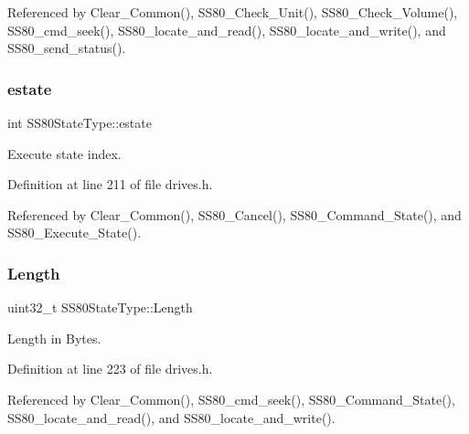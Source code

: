Referenced by Clear\+\_\+\+Common(), S\+S80\+\_\+\+Check\+\_\+\+Unit(), S\+S80\+\_\+\+Check\+\_\+\+Volume(), S\+S80\+\_\+cmd\+\_\+seek(), S\+S80\+\_\+locate\+\_\+and\+\_\+read(), S\+S80\+\_\+locate\+\_\+and\+\_\+write(), and S\+S80\+\_\+send\+\_\+status().

\mbox{\label{structSS80StateType_ae4a94143cb4201687be4e33684be057e}} 
\subsubsection{\texorpdfstring{estate}{estate}}
{\footnotesize\ttfamily int S\+S80\+State\+Type\+::estate}



Execute state index. 



Definition at line 211 of file drives.\+h.



Referenced by Clear\+\_\+\+Common(), S\+S80\+\_\+\+Cancel(), S\+S80\+\_\+\+Command\+\_\+\+State(), and S\+S80\+\_\+\+Execute\+\_\+\+State().

\mbox{\label{structSS80StateType_a507159f0a0a4f3127488081fd618e8f6}} 
\subsubsection{\texorpdfstring{Length}{Length}}
{\footnotesize\ttfamily uint32\+\_\+t S\+S80\+State\+Type\+::\+Length}



Length in Bytes. 



Definition at line 223 of file drives.\+h.



Referenced by Clear\+\_\+\+Common(), S\+S80\+\_\+cmd\+\_\+seek(), S\+S80\+\_\+\+Command\+\_\+\+State(), S\+S80\+\_\+locate\+\_\+and\+\_\+read(), and S\+S80\+\_\+locate\+\_\+and\+\_\+write().

\mbox{\label{structSS80StateType_ad4911c7b89ec1ff2c0aa01881b1e3d3a}} 

